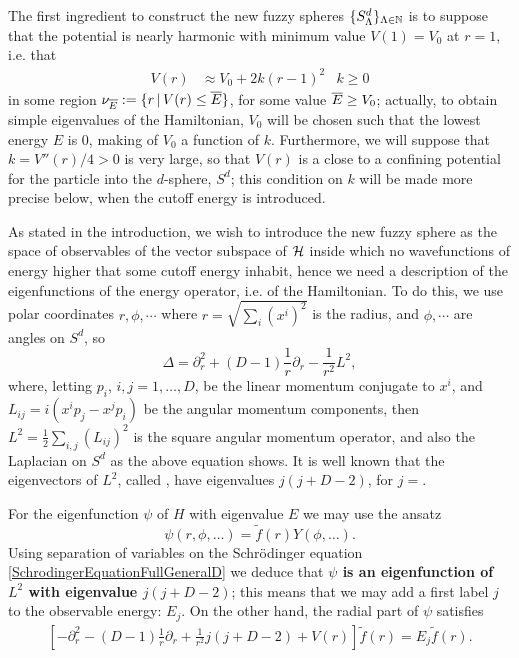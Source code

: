 The first ingredient to construct the new fuzzy spheres $\{S^d_\Lambda\}_{\Lambda \in \mathbb{N}}$ is to suppose that the potential is nearly harmonic with minimum value $V(1) = V_0$ at $r = 1$, i.e. that
\begin{align}\label{equationPotentialHarmonicGeneralD}
            V(r) &\approx V_0 + 2k(r-1)^2 & k \geq 0
    \end{align}
in some region $\nu_{\overline{E}} := \{r \,|\, V(r) \leq \overline{E}\}$, for some value $\overline{E} \geq V_0$; actually, to obtain simple eigenvalues of the Hamiltonian, $V_0$ will be chosen such that the lowest energy $E$ is $0$, making of $V_0$ a function of $k$. Furthermore, we will suppose that $k = V''(r)/4 > 0$ is very large, so that $V(r)$ is a close to a confining potential for the particle into the $d$-sphere, $S^d$; this condition on $k$ will be made more precise below, when the cutoff energy is introduced.

\lin

As stated in the introduction, we wish to introduce the new fuzzy sphere as the space of observables of the vector subspace of $\mathcal H$ inside which no wavefunctions of energy higher that some cutoff energy inhabit, hence we need a description of the eigenfunctions of the energy operator, i.e. of the Hamiltonian. 
To do this, we use polar coordinates $r, \phi, \cdots$ where $r = \sqrt{\sum_i (x^i)^2}$ is the radius, and $\phi, \cdots$ are angles on $S^d$, so
\begin{equation}\label{LaplacianPolarCoordinatesGeneralD}
    \Delta = \partial_r^2 + (D-1)\frac{1}{r} \partial_r - \frac{1}{r^2} L^2,
\end{equation}
where, letting $p_i$, $i, j = 1, \dots, D$, be the linear momentum conjugate to $x^i$, and $L_{ij} = i(x^i p_j - x^j p_i)$ be the angular momentum components, then $L^2 = \frac{1}{2} \sum_{i, j} (L_{ij})^2$ is the square angular momentum operator, and also the Laplacian on $S^d$ as the above equation shows. It is well known \cite{} that the eigenvectors of $L^2$, called , have eigenvalues $j(j+D-2)$, for $j = $. 

For the eigenfunction $\psi$ of $H$ with eigenvalue $E$  we may use the ansatz
\begin{equation}\label{ansatzSolutionEigenfunctionEigenvalueEnergyHamiltonianGeneralD}
    \psi(r, \phi, \dots) = \tilde f(r) Y(\phi, \dots).
\end{equation}
Using separation of variables on the Schr\"odinger equation \ref{SchrodingerEquationFullGeneralD} we deduce that \textbf{$\psi$ is an eigenfunction of $L^2$ with eigenvalue $j(j+D-2)$}; this means that we may add a first label $j$ to the observable energy: $E_j$. On the other hand, the radial part of $\psi$ satisfies
\begin{align}\label{equationRadialSchrodingerGeneralDPolarAngles}
        \left[-\partial_r^2 - (D-1) \frac{1}{r} \partial_r + \frac{1}{r^2} j(j+D-2) + V(r)\right] \tilde f(r) = E_j \tilde f(r).
\end{align}

